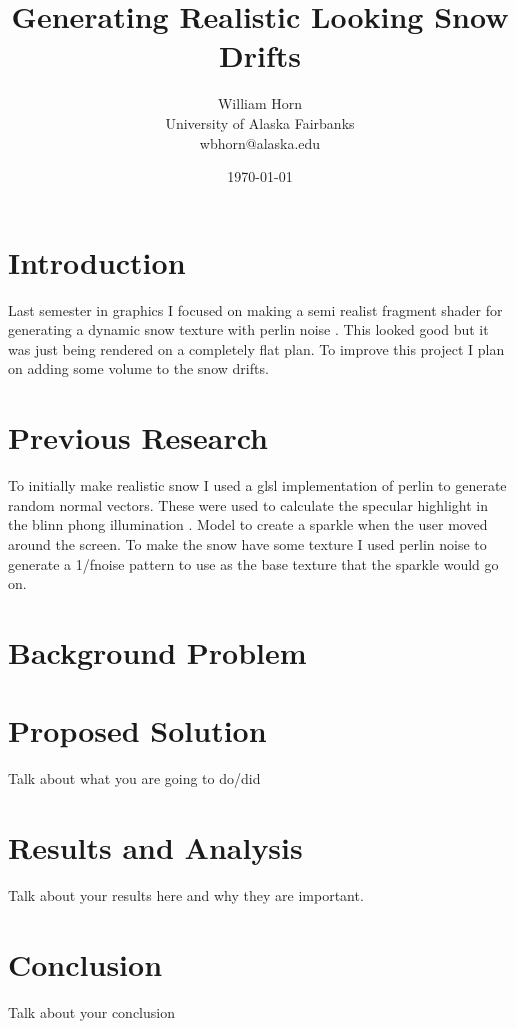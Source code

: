 \documentclass{article}
\begin{document}
\title{Generating Realistic Looking Snow Drifts}
\author{William Horn\\University of Alaska Fairbanks\\wbhorn@alaska.edu}
\date{\today}
\maketitle

\section{Introduction}

Last semester in graphics I focused on making a semi realist fragment shader for
generating a dynamic snow texture with perlin noise \cite{wiki:perlin}. This looked good but it
was just being rendered on a completely flat plan. To improve this project I
plan on adding some volume to the snow drifts.

\section{Previous Research}

To initially make realistic snow I used a glsl implementation of perlin \cite{noiseglsl} to generate random
normal vectors. These were used to calculate the specular highlight in the blinn phong illumination
\cite{blinn1977models}. Model to create a sparkle when the user moved around the screen.
To make the snow have some texture I used perlin noise to generate a 1/fnoise pattern to use
as the base texture that the sparkle would go on.

\section{Background Problem}

\section{Proposed Solution}

Talk about what you are going to do/did

\section{Results and Analysis}

Talk about your results here and why they are important.

\section{Conclusion}

Talk about your conclusion



\end{document}

